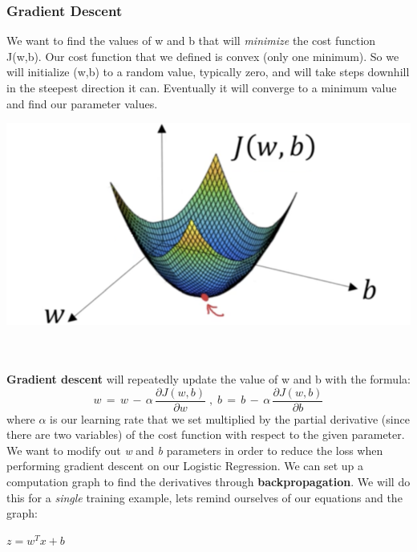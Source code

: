 \documentclass[11pt, a4paper]{article}
\begin{document}
\begin{spacing}{1.1}
	\subsubsection{Gradient Descent}
	\begin{minipage}[c]{10cm}
	We want to find the values of w and b that will \textit{minimize} the cost function J(w,b). Our cost function that we defined is convex (only one minimum). So we will initialize (w,b) to a random value, typically zero, and will take steps downhill in the steepest direction it can. Eventually it will converge to a minimum value and find our parameter values.
	\end{minipage}
	\begin{minipage}[c]{6cm}
	\includegraphics[scale=.4]{grad_desc}
	\end{minipage} \vspace*{4mm} \\~\\
	\textbf{Gradient descent} will repeatedly update the value of w and b with the formula: $$ w \, = \, w \, - \, \alpha \, \frac{ \partial J(w,b)}{\partial w} \; , \; b \, = \, b \, - \, \alpha \, \frac{\partial J(w,b)}{\partial b} $$ where $\alpha$ is our learning rate that we set multiplied by the partial derivative (since there are two variables) of the cost function with respect to the given parameter. \vspace*{2mm} \\
	We want to modify out \textit{w} and \textit{b} parameters in order to reduce the loss when performing gradient descent on our Logistic Regression. We can set up a computation graph to find the derivatives through \textbf{backpropagation}. We will do this for a \textit{single} training example, lets remind ourselves of our equations and the graph: \\
	\begin{minipage}[c]{8cm}
	$ z = w^Tx+ b$ \\

\end{minipage}
\end{spacing}
\end{document}
